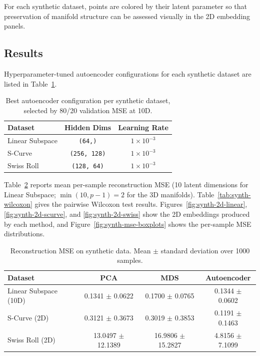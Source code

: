 \documentclass[11pt]{article}
\begin{document}
For each synthetic dataset, points are colored by their latent parameter so that preservation of manifold structure can be assessed visually in the 2D embedding panels.

\subsection{Results}

Hyperparameter-tuned autoencoder configurations for each synthetic dataset are listed in Table~\ref{tab:synth-hp}.

\begin{table}[H]
\centering
\caption{Best autoencoder configuration per synthetic dataset, selected by 80/20 validation MSE at 10D.}
\label{tab:synth-hp}
\begin{tabular}{lcc}
\toprule
\textbf{Dataset} & \textbf{Hidden Dims} & \textbf{Learning Rate} \\
\midrule
Linear Subspace & \texttt{(64,)}       & $1 \times 10^{-3}$ \\
S-Curve         & \texttt{(256, 128)}  & $1 \times 10^{-3}$ \\
Swiss Roll      & \texttt{(128, 64)}   & $1 \times 10^{-3}$ \\
\bottomrule
\end{tabular}
\end{table}

Table~\ref{tab:synth-mse} reports mean per-sample reconstruction MSE (10 latent dimensions for Linear Subspace; $\min(10, p-1) = 2$ for the 3D manifolds). Table~\ref{tab:synth-wilcoxon} gives the pairwise Wilcoxon test results. Figures~\ref{fig:synth-2d-linear}, \ref{fig:synth-2d-scurve}, and \ref{fig:synth-2d-swiss} show the 2D embeddings produced by each method, and Figure~\ref{fig:synth-mse-boxplots} shows the per-sample MSE distributions.

\begin{table}[H]
\centering
\caption{Reconstruction MSE on synthetic data. Mean $\pm$ standard deviation over 1000 samples.}
\label{tab:synth-mse}
\begin{tabular}{lccc}
\toprule
\textbf{Dataset} & \textbf{PCA} & \textbf{MDS} & \textbf{Autoencoder} \\
\midrule
Linear Subspace (10D) & 0.1341 $\pm$ 0.0622 & 0.1700 $\pm$ 0.0765 & 0.1344 $\pm$ 0.0602 \\
S-Curve (2D)          & 0.3121 $\pm$ 0.3673 & 0.3019 $\pm$ 0.3853 & 0.1191 $\pm$ 0.1463 \\
Swiss Roll (2D)       & 13.0497 $\pm$ 12.1389 & 16.9806 $\pm$ 15.2827 & 4.8156 $\pm$ 7.1099 \\
\bottomrule
\end{tabular}
\end{table}
\end{document}
